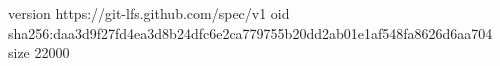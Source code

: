version https://git-lfs.github.com/spec/v1
oid sha256:daa3d9f27fd4ea3d8b24dfc6e2ca779755b20dd2ab01e1af548fa8626d6aa704
size 22000

